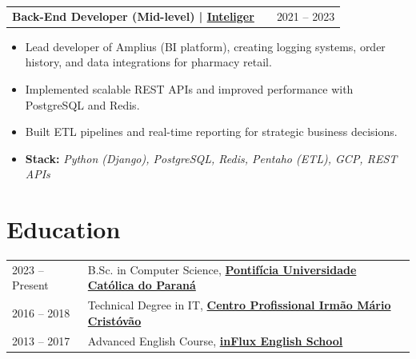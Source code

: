\documentclass[a4paper,12pt]{article}
\makeatletter
\newenvironment{joblong}[2]
{
    \begin{tabularx}{\linewidth}{@{}l X r@{}}
        \textbf{#1} & \hfill & #2 \\[3.75pt]
    \end{tabularx}
    \begin{minipage}[t]{\linewidth}
    }
    {
    \end{minipage}
}
\newenvironment{bullets}
{
    \begin{itemize}[nosep,after=\strut, leftmargin=1em, itemsep=3pt,label=--]
    }
    {
    \end{itemize}
}
\makeatother
\begin{document}
    \begin{joblong}{Back-End Developer (Mid-level) | \href{https://inteliger.com.br}{\textbf{Inteliger}}}{2021 -- 2023}
        \begin{bullets}
            \item Lead developer of Amplius (BI platform), creating logging systems, order history, and data integrations for pharmacy retail.
            \item Implemented scalable REST APIs and improved performance with PostgreSQL and Redis.
            \item Built ETL pipelines and real-time reporting for strategic business decisions.
            \item \textbf{Stack:} \textit{Python (Django), PostgreSQL, Redis, Pentaho (ETL), GCP, REST APIs}
        \end{bullets}
    \end{joblong}





    \section{Education}
    \begin{tabularx}{\linewidth}{@{}l X@{}}
        2023 -- Present & B.Sc. in Computer Science, \href{https://www.pucpr.br}{\textbf{Pontifícia Universidade Católica do Paraná}} \\
        2016 -- 2018 & Technical Degree in IT, \href{http://www.tecpuc.com.br}{\textbf{Centro Profissional Irmão Mário Cristóvão}} \\
        2013 -- 2017 & Advanced English Course, \href{http://www.influx.com.br}{\textbf{inFlux English School}} \\
    \end{tabularx}
\end{document}

